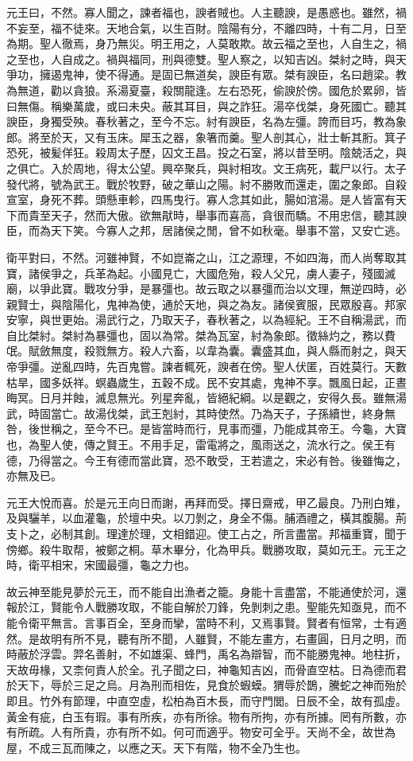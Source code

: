 元王曰，不然。寡人聞之，諫者福也，諛者賊也。人主聽諛，是愚惑也。雖然，禍不妄至，福不徒來。天地合氣，以生百財。陰陽有分，不離四時，十有二月，日至為期。聖人徹焉，身乃無災。明王用之，人莫敢欺。故云福之至也，人自生之，禍之至也，人自成之。禍與福同，刑與德雙。聖人察之，以知吉凶。桀紂之時，與天爭功，擁遏鬼神，使不得通。是固已無道矣，諛臣有眾。桀有諛臣，名曰趙梁。教為無道，勸以貪狼。系湯夏臺，殺關龍逢。左右恐死，偷諛於傍。國危於累卵，皆曰無傷。稱樂萬歲，或曰未央。蔽其耳目，與之詐狂。湯卒伐桀，身死國亡。聽其諛臣，身獨受殃。春秋著之，至今不忘。紂有諛臣，名為左彊。誇而目巧，教為象郎。將至於天，又有玉床。犀玉之器，象箸而羹。聖人剖其心，壯士斬其胻。箕子恐死，被髪佯狂。殺周太子歷，囚文王昌。投之石室，將以昔至明。陰兢活之，與之俱亡。入於周地，得太公望。興卒聚兵，與紂相攻。文王病死，載尸以行。太子發代將，號為武王。戰於牧野，破之華山之陽。紂不勝敗而還走，圍之象郎。自殺宣室，身死不葬。頭懸車軫，四馬曳行。寡人念其如此，腸如涫湯。是人皆富有天下而貴至天子，然而大傲。欲無猒時，舉事而喜高，貪很而驕。不用忠信，聽其諛臣，而為天下笑。今寡人之邦，居諸侯之閒，曾不如秋毫。舉事不當，又安亡逃。

衛平對曰，不然。河雖神賢，不如崑崙之山，江之源理，不如四海，而人尚奪取其寶，諸侯爭之，兵革為起。小國見亡，大國危殆，殺人父兄，虜人妻子，殘國滅廟，以爭此寶。戰攻分爭，是暴彊也。故云取之以暴彊而治以文理，無逆四時，必親賢士，與陰陽化，鬼神為使，通於天地，與之為友。諸侯賓服，民眾殷喜。邦家安寧，與世更始。湯武行之，乃取天子，春秋著之，以為經紀。王不自稱湯武，而自比桀紂。桀紂為暴彊也，固以為常。桀為瓦室，紂為象郎。徵絲灼之，務以費氓。賦斂無度，殺戮無方。殺人六畜，以韋為囊。囊盛其血，與人縣而射之，與天帝爭彊。逆亂四時，先百鬼嘗。諫者輒死，諛者在傍。聖人伏匿，百姓莫行。天數枯旱，國多妖祥。螟蟲歲生，五穀不成。民不安其處，鬼神不享。飄風日起，正晝晦冥。日月并蝕，滅息無光。列星奔亂，皆絕紀綱。以是觀之，安得久長。雖無湯武，時固當亡。故湯伐桀，武王剋紂，其時使然。乃為天子，子孫續世，終身無咎，後世稱之，至今不已。是皆當時而行，見事而彊，乃能成其帝王。今龜，大寶也，為聖人使，傳之賢王。不用手足，雷電將之，風雨送之，流水行之。侯王有德，乃得當之。今王有德而當此寶，恐不敢受，王若遣之，宋必有咎。後雖悔之，亦無及已。

元王大悅而喜。於是元王向日而謝，再拜而受。擇日齋戒，甲乙最良。乃刑白雉，及與驪羊，以血灌龜，於壇中央。以刀剝之，身全不傷。脯酒禮之，橫其腹腸。荊支卜之，必制其創。理達於理，文相錯迎。使工占之，所言盡當。邦福重寶，聞于傍鄉。殺牛取帮，被鄭之桐。草木畢分，化為甲兵。戰勝攻取，莫如元王。元王之時，衛平相宋，宋國最彊，龜之力也。

故云神至能見夢於元王，而不能自出漁者之籠。身能十言盡當，不能通使於河，還報於江，賢能令人戰勝攻取，不能自解於刀鋒，免剝刺之患。聖能先知亟見，而不能令衛平無言。言事百全，至身而攣，當時不利，又焉事賢。賢者有恒常，士有適然。是故明有所不見，聽有所不聞，人雖賢，不能左畫方，右畫圓，日月之明，而時蔽於浮雲。羿名善射，不如雄渠、蜂門，禹名為辯智，而不能勝鬼神。地柱折，天故毋椽，又柰何責人於全。孔子聞之曰，神龜知吉凶，而骨直空枯。日為德而君於天下，辱於三足之烏。月為刑而相佐，見食於蝦蟆。猬辱於鵲，騰蛇之神而殆於即且。竹外有節理，中直空虛，松柏為百木長，而守門閭。日辰不全，故有孤虛。黃金有疵，白玉有瑕。事有所疾，亦有所徐。物有所拘，亦有所據。罔有所數，亦有所疏。人有所貴，亦有所不如。何可而適乎。物安可全乎。天尚不全，故世為屋，不成三瓦而陳之，以應之天。天下有階，物不全乃生也。

